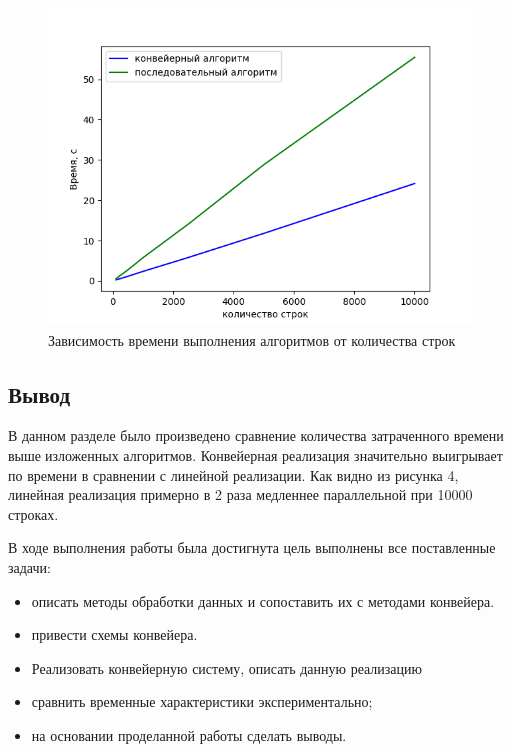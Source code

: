 \begin{figure}
    \centering
    \includegraphics[scale=0.85]{plot.png}
    \caption{Зависимость времени выполнения алгоритмов от количества строк}
    \label{img:plot_best}
\end{figure}

\subsection{Вывод}

В данном разделе было произведено сравнение количества затраченного времени вышеизложенных алгоритмов.
Конвейерная реализация значительно выигрывает
по времени в сравнении с  линейной реализации. Как видно из рисунка 4, линейная
реализация примерно в 2 раза медленнее параллельной при 10000 строках.




В ходе выполнения работы была достигнута цель выполнены все поставленные задачи:

\begin{itemize}
    \item описать методы обработки данных и  сопоставить их с  методами конвейера.
    \item привести схемы конвейера.
    \item Реализовать конвейерную систему, описать данную реализацию
    \item сравнить  временные характеристики экспериментально;
    \item на основании проделанной работы сделать выводы.
\end{itemize}

